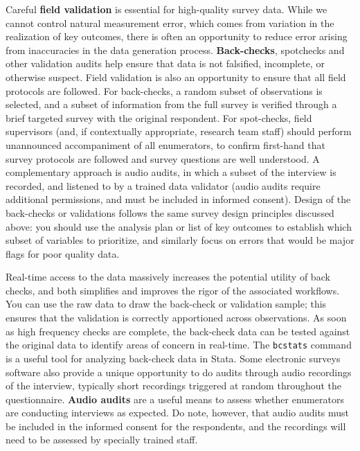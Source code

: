 Careful \textbf{field validation} is essential for high-quality survey data.
While we cannot control natural measurement error,
which comes from variation in the realization of key outcomes,
there is often an opportunity to reduce error arising from inaccuracies in the data generation process.
\textbf{Back-checks}, spotchecks and other validation audits help ensure that 
data is not falsified, incomplete, or otherwise suspect.
Field validation is also an opportunity to ensure that all field protocols are followed.
For back-checks, a random subset of observations is selected,
and a subset of information from the full survey is
verified through a brief targeted survey with the original respondent.
For spot-checks, field supervisors (and, if contextually appropriate, research team staff)
should perform unannounced accompaniment of all enumerators, 
to confirm first-hand that survey protocols are followed and 
survey questions are well understood. 
A complementary approach is audio audits, 
in which a subset of the interview is recorded, and listened to by a trained data validator
(audio audits require additional permissions, and must be included in informed consent).
Design of the back-checks or validations follows the same survey design
principles discussed above: you should use the analysis plan
or list of key outcomes to establish which subset of variables to prioritize,
and similarly focus on errors that would be major flags for poor quality data.

Real-time access to the data massively increases the potential utility of back checks,
and both simplifies and improves the rigor of the associated workflows.
You can use the raw data to draw the back-check or validation sample;
this ensures that the validation is correctly apportioned across observations.
As soon as high frequency checks are complete,
the back-check data can be tested against
the original data to identify areas of concern in real-time.
The \texttt{bcstats} command is a useful tool for analyzing back-check data in Stata.
Some electronic surveys software also provide a unique opportunity
to do audits through audio recordings of the interview,
typically short recordings triggered at random throughout the questionnaire.
\textbf{Audio audits}
are a useful means to assess whether enumerators are conducting interviews as expected.
Do note, however, that audio audits must be included in the informed consent for the respondents,
and the recordings will need to be assessed by specially trained staff.



